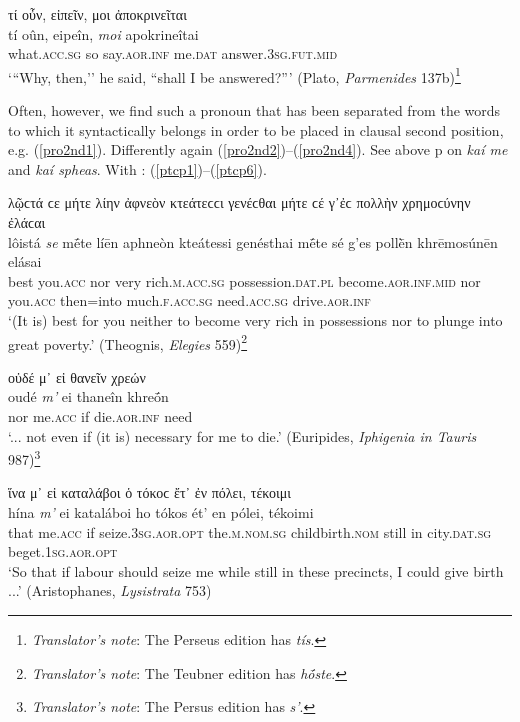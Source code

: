 \begin{exe}
\ex τί οὖν, εἰπεῖν, μοι ἀποκρινεῖται\\
\gll tí oûn, eipeîn, \emph{moi} apokrineîtai\\
what.\textsc{acc.sg} so say.\textsc{aor.inf} me.\textsc{dat} answer.\textsc{3sg.fut.mid}\\
\trans `{``}Why, then,'' he said, ``shall I be answered?''' (Plato, \textit{Parmenides} 137b)\footnote{\emph{Translator's note}: The Perseus edition has \textit{tís}.}
\label{moiapokr}
\end{exe}

Often, however, we find such a pronoun that has been separated from the words to which it syntactically belongs in order to be placed in clausal second position, e.g. (\ref{pro2nd1}). Differently again (\ref{pro2nd2})--(\ref{pro2nd4}). See above p\pageref{kaime} on \textit{kaí me} and \textit{kaí spheas}. With : (\ref{ptcp1})--(\ref{ptcp6}).

\begin{exe}
\ex λῷϲτά ϲε μήτε λίην ἀφνεὸν κτεάτεϲϲι γενέϲθαι μήτε ϲέ γ᾽ἐϲ πολλὴν χρημοϲύνην ἐλάϲαι\\
\gll lôistá \emph{se} mḗte líēn aphneòn kteátessi genésthai mḗte sé g'es pollḕn khrēmosúnēn elásai\\
best you.\textsc{acc} nor very rich.\textsc{m.acc.sg} possession.\textsc{dat.pl} become.\textsc{aor.inf.mid} nor you.\textsc{acc} then=into much.\textsc{f.acc.sg} need.\textsc{acc.sg} drive.\textsc{aor.inf}\\
\trans `(It is) best for you neither to become very rich in possessions nor to plunge into great poverty.' (Theognis, \textit{Elegies} 559)\footnote{\emph{Translator's note}: The Teubner edition \citep{Hiller1890} has \textit{hṓste}.}
\label{pro2nd1}
\end{exe}

\begin{exe}
\ex οὐδέ μ᾽ εἰ θανεῖν χρεών\\
\gll oudé \emph{m'} ei thaneîn khreṓn\\
nor me.\textsc{acc} if die.\textsc{aor.inf} need\\
\trans `... not even if (it is) necessary for me to die.' (Euripides, \textit{Iphigenia in Tauris} 987)\footnote{\emph{Translator's note}: The Persus edition has \textit{s'}.}
\label{pro2nd2}
\end{exe}

\begin{exe}
\ex ἵνα μ᾽ εἰ καταλάβοι ὁ τόκοϲ ἔτ᾽ ἐν πόλει, τέκοιμι\\
\gll hína \emph{m'} ei kataláboi ho tókos ét' en pólei, tékoimi\\
that me.\textsc{acc} if seize.\textsc{3sg.aor.opt} the.\textsc{m.nom.sg} childbirth.\textsc{nom} still in city.\textsc{dat.sg} beget.\textsc{1sg.aor.opt}\\
\trans `So that if labour should seize me while still in these precincts, I could give birth ...' (Aristophanes, \textit{Lysistrata} 753)
\label{pro2nd3}
\end{exe}

